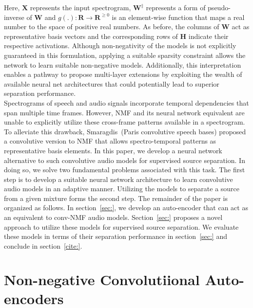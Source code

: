 \documentclass{article}
\begin{document}
Here, $\mathbf{X}$ represents the input spectrogram, $\mathbf{W^{\ddagger}}$ represents a form of pseudo-inverse of $\mathbf{W}$ and $g(.):\mathbf{R}\rightarrow \mathbf{R}^{\geq0}$ is an element-wise function that maps a real number to the space of positive real numbers. As before, the columns of $\mathbf{W}$ act as representative basis vectors and the corresponding rows of $\mathbf{H}$ indicate their respective activations. Although non-negativity of the models is not explicitly guaranteed in this formulation, applying a suitable sparsity constraint allows the network to learn suitable non-negative models. Additionally, this interpretation enables a pathway to propose multi-layer extensions by exploiting the wealth of available neural net architectures that could potentially lead to superior separation performance. \\

Spectrograms of speech and audio signals incorporate temporal dependencies that span multiple time frames. However, NMF and its neural network equivalent are unable to explicitly utilize these cross-frame patterns available in a spectrogram. To alleviate this drawback, Smaragdis~\cite{}(Paris convolutive speech bases) proposed a convolutive version to NMF that allows spectro-temporal patterns as representative basis elements. In this paper, we develop a neural network alternative to such convolutive audio models for supervised source separation. In doing so, we solve two fundamental problems associated with this task. The first step is to develop a suitable neural network architecture to learn convolutive audio models in an adaptive manner. Utilizing the models to separate a source from a given mixture forms the second step. The remainder of the paper is organized as follows. In section~\ref{sec:}, we develop an auto-encoder that can act as an equivalent to conv-NMF audio models. Section~\ref{sec:} proposes a novel approach to utilize these models for supervised source separation. We evaluate these models in terms of their separation performance in section~\ref{sec:} and conclude in section~\ref{cite:}. \\

\section{Non-negative Convolutiional Auto-encoders}
\end{document}
